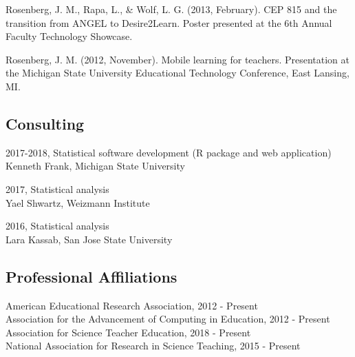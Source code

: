 \documentclass[]{article}
\begin{document}
Rosenberg, J. M., Rapa, L., \& Wolf, L. G. (2013, February). CEP 815 and
the transition from ANGEL to Desire2Learn. Poster presented at the 6th
Annual Faculty Technology Showcase.

Rosenberg, J. M. (2012, November). Mobile learning for teachers.
Presentation at the Michigan State University Educational Technology
Conference, East Lansing, MI.

\subsection{Consulting}\label{consulting}

2017-2018, Statistical software development (R package and web
application)\\
Kenneth Frank, Michigan State University

2017, Statistical analysis\\
Yael Shwartz, Weizmann Institute

2016, Statistical analysis\\
Lara Kassab, San Jose State University

\subsection{Professional Affiliations}\label{professional-affiliations}

American Educational Research Association, 2012 - Present\\
Association for the Advancement of Computing in Education, 2012 -
Present\\
Association for Science Teacher Education, 2018 - Present\\
National Association for Research in Science Teaching, 2015 - Present
\end{document}

